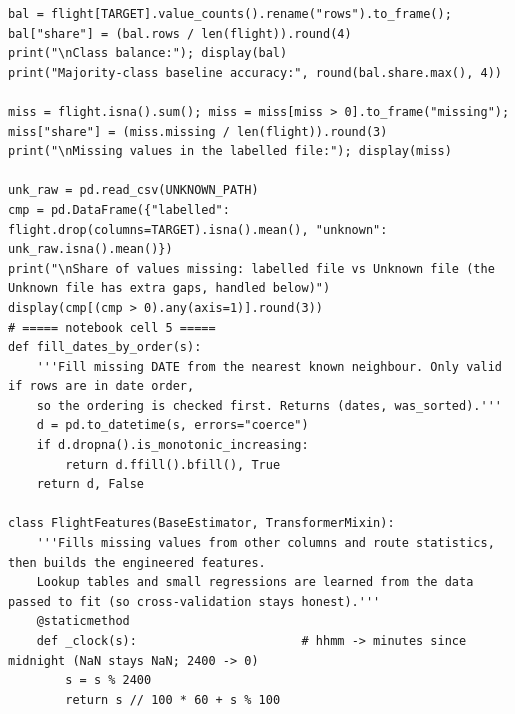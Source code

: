 \documentclass[12pt,a4paper]{article}
\begin{document}
\begin{lstlisting}[style=code]
bal = flight[TARGET].value_counts().rename("rows").to_frame(); bal["share"] = (bal.rows / len(flight)).round(4)
print("\nClass balance:"); display(bal)
print("Majority-class baseline accuracy:", round(bal.share.max(), 4))

miss = flight.isna().sum(); miss = miss[miss > 0].to_frame("missing"); miss["share"] = (miss.missing / len(flight)).round(3)
print("\nMissing values in the labelled file:"); display(miss)

unk_raw = pd.read_csv(UNKNOWN_PATH)
cmp = pd.DataFrame({"labelled": flight.drop(columns=TARGET).isna().mean(), "unknown": unk_raw.isna().mean()})
print("\nShare of values missing: labelled file vs Unknown file (the Unknown file has extra gaps, handled below)")
display(cmp[(cmp > 0).any(axis=1)].round(3))
# ===== notebook cell 5 =====
def fill_dates_by_order(s):
    '''Fill missing DATE from the nearest known neighbour. Only valid if rows are in date order,
    so the ordering is checked first. Returns (dates, was_sorted).'''
    d = pd.to_datetime(s, errors="coerce")
    if d.dropna().is_monotonic_increasing:
        return d.ffill().bfill(), True
    return d, False

class FlightFeatures(BaseEstimator, TransformerMixin):
    '''Fills missing values from other columns and route statistics, then builds the engineered features.
    Lookup tables and small regressions are learned from the data passed to fit (so cross-validation stays honest).'''
    @staticmethod
    def _clock(s):                       # hhmm -> minutes since midnight (NaN stays NaN; 2400 -> 0)
        s = s % 2400
        return s // 100 * 60 + s % 100


\end{lstlisting}
\end{document}

